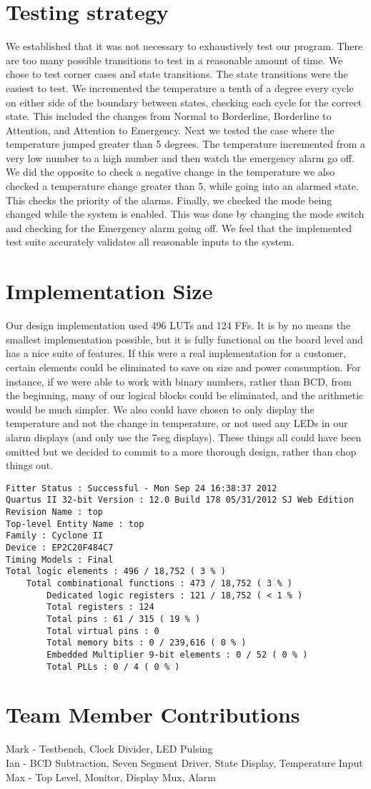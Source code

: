 \documentclass[12pt]{article}
\begin{document}
\section*{Testing strategy}
We established that it was not necessary to exhaustively test our program. There are too many possible transitions to test in a reasonable amount of time. We chose to test corner cases and state transitions. The state transitions were the easiest to test. We incremented the temperature a tenth of a degree every cycle on either side of the boundary between states, checking each cycle for the correct state. This included the changes from Normal to Borderline, Borderline to Attention, and Attention to Emergency. Next we tested the case where the temperature jumped greater than 5 degrees. The temperature incremented from a very low number to a high number and then watch the emergency alarm go off. We did the opposite to check a negative change in the temperature we also checked a temperature change greater than 5, while going into an alarmed state. This checks the priority of the alarms. Finally, we checked the mode being changed while the system is enabled. This was done by changing the mode switch and checking for the Emergency alarm going off. We feel that the implemented test suite accurately validates all reasonable inputs to the system.


\section*{Implementation Size}
Our design implementation used 496 LUTs and 124 FFs. It is by no means the smallest implementation possible, but it is fully functional on the board level and has a nice suite of features. If this were a real implementation for a customer, certain elements could be eliminated to save on size and power consumption. For instance, if we were able to work with binary numbers, rather than BCD, from the beginning, many of our logical blocks could be eliminated, and the arithmetic would be much simpler. We also could have chosen to only display the temperature and not the change in temperature, or not used any LEDs in our alarm displays (and only use the 7seg displays). These things all could have been omitted but we decided to commit to a more thorough design, rather than chop things out.

\begin{verbatim}
Fitter Status : Successful - Mon Sep 24 16:38:37 2012
Quartus II 32-bit Version : 12.0 Build 178 05/31/2012 SJ Web Edition
Revision Name : top
Top-level Entity Name : top
Family : Cyclone II
Device : EP2C20F484C7
Timing Models : Final
Total logic elements : 496 / 18,752 ( 3 % )
    Total combinational functions : 473 / 18,752 ( 3 % )
        Dedicated logic registers : 121 / 18,752 ( < 1 % )
        Total registers : 124
        Total pins : 61 / 315 ( 19 % )
        Total virtual pins : 0
        Total memory bits : 0 / 239,616 ( 0 % )
        Embedded Multiplier 9-bit elements : 0 / 52 ( 0 % )
        Total PLLs : 0 / 4 ( 0 % )
\end{verbatim}

\section*{Team Member Contributions}
Mark - Testbench, Clock Divider, LED Pulsing\\
Ian - BCD Subtraction, Seven Segment Driver, State Display, Temperature Input\\
Max - Top Level, Monitor, Display Mux, Alarm\\
\end{document}
